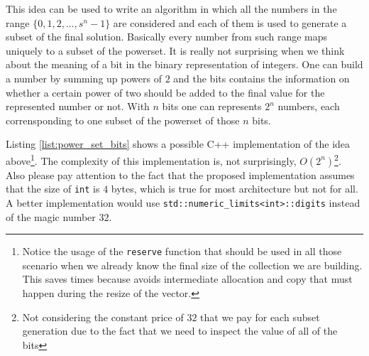 This idea can be used to write an algorithm in which all the numbers in the range $\{0,1,2,\ldots,
s^n-1\}$ are considered and each of them is used to generate a subset of the final solution.
Basically every number from such range maps uniquely to a subset of the powerset. It is really not
surprising when we think about the meaning of a bit in the binary representation of integers. One
can build a number by summing up powers of $2$ and the bits contains the information on whether a
certain power of two should be added to the final value for the represented number or not. With $n$
bits one can represents $2^n$ numbers, each corrensponding to one subset of the powerset of those
$n$ bits.

Listing \ref{list:power_set_bits} shows  a possible C++ implementation of the idea above\footnote{Notice the usage of the \texttt{reserve}
function that should be used in all those scenario when we already know the final size of the
collection we are building. This saves times because avoids intermediate allocation and copy that
must happen during the resize of the vector.}. The complexity of this implementation is, not
surprisingly, $O(2^n)$\footnote{Not considering the constant price of $32$ that we pay for each
subset generation due to the fact that we need to inspect the value of all of the bits}. Also please
pay attention to the fact that the proposed implementation assumes that the size of
\lstinline[columns=fixed]{int} is $4$ bytes, which is true for most architecture but not for all\cite{cit::std::fundamentaltypes}. A better
implementation would use \lstinline[columns=fixed]{std::numeric_limits<int>::digits} instead of
the magic number $32$.


\begin{minipage}{\linewidth}
	
\end{minipage}


